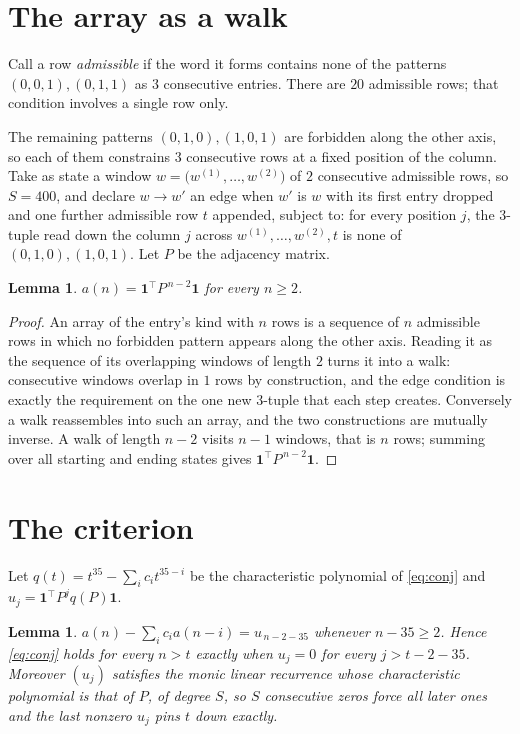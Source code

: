 \documentclass[11pt,a4paper]{article}
\theoremstyle{plain}
\newtheorem{lemma}[theorem]{Lemma}
\theoremstyle{definition}
\begin{document}
\section{The array as a walk}

Call a row \emph{admissible} if the word it forms contains none of the patterns
$(0,0,1), (0,1,1)$ as $3$ consecutive entries. There are $20$ admissible rows; that condition
involves a single row only.

The remaining patterns $(0,1,0), (1,0,1)$ are forbidden along the other axis, so each of them
constrains $3$ consecutive rows at a fixed position of the column. Take as state a
window $w=\bigl(w^{(1)},\dots,w^{(2)}\bigr)$ of $2$ consecutive admissible
rows, so $S=400$, and declare $w\to w'$ an edge when $w'$ is $w$ with its first entry
dropped and one further admissible row $t$ appended, subject to: for every position
$j$, the $3$-tuple read down the column $j$ across $w^{(1)},\dots,w^{(2)},t$
is none of $(0,1,0), (1,0,1)$. Let $P$ be the adjacency matrix.

\begin{lemma}\label{lem:walk}
$a(n)=\mathbf{1}^{\!\top}P^{\,n-2}\mathbf{1}$ for every $n\ge2$.
\end{lemma}

\begin{proof}
An array of the entry's kind with $n$ rows is a sequence of $n$ admissible rows in
which no forbidden pattern appears along the other axis. Reading it as the sequence of its
overlapping windows of length $2$ turns it into a walk: consecutive windows overlap in
$1$ rows by construction, and the edge condition is exactly the requirement on the one
new $3$-tuple that each step creates. Conversely a walk reassembles into such an array,
and the two constructions are mutually inverse. A walk of length $n-2$ visits $n-1$
windows, that is $n$ rows; summing over all starting and ending states gives
$\mathbf{1}^{\!\top}P^{\,n-2}\mathbf{1}$.
\end{proof}

\section{The criterion}

Let $q(t)=t^{35}-\sum_i c_i t^{35-i}$ be the characteristic polynomial of
\eqref{eq:conj} and $u_j=\mathbf{1}^{\!\top}P^{j}q(P)\mathbf{1}$.

\begin{lemma}\label{lem:crit}
$a(n)-\sum_i c_i a(n-i)=u_{\,n-2-35}$ whenever $n-35\ge2$. Hence
\eqref{eq:conj} holds for every $n>t$ exactly when $u_j=0$ for every
$j>t-2-35$. Moreover $(u_j)$ satisfies the monic linear recurrence whose
characteristic polynomial is that of $P$, of degree $S$, so $S$ consecutive zeros force all
later ones and the last nonzero $u_j$ pins $t$ down exactly.
\end{lemma}
\end{document}
